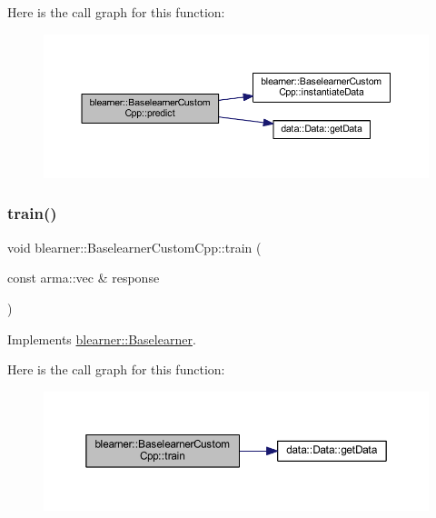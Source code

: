 Here is the call graph for this function\+:\nopagebreak
\begin{figure}[H]
\begin{center}
\leavevmode
\includegraphics[width=350pt]{classblearner_1_1_baselearner_custom_cpp_a55fb45a929fea01f79fa3dcad7698174_cgraph}
\end{center}
\end{figure}
\mbox{\label{classblearner_1_1_baselearner_custom_cpp_a7437b1175498b928d3202b586527d2c4}} 
\subsubsection{\texorpdfstring{train()}{train()}}
{\footnotesize\ttfamily void blearner\+::\+Baselearner\+Custom\+Cpp\+::train (\begin{DoxyParamCaption}\item[{const arma\+::vec \&}]{response }\end{DoxyParamCaption})\hspace{0.3cm}{\ttfamily [virtual]}}



Implements \mbox{\hyperlink{classblearner_1_1_baselearner_a40e03ad070b9a03aae706d9ee8094b80}{blearner\+::\+Baselearner}}.

Here is the call graph for this function\+:\nopagebreak
\begin{figure}[H]
\begin{center}
\leavevmode
\includegraphics[width=350pt]{classblearner_1_1_baselearner_custom_cpp_a7437b1175498b928d3202b586527d2c4_cgraph}
\end{center}
\end{figure}


